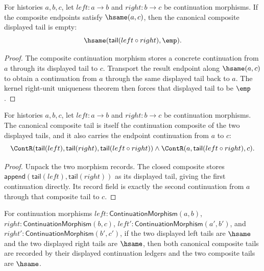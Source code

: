 \begin{theorem}
\label{thm:category-continuation-morphism-composite-endpoint-cycle-tail-empty}
For histories $a,b,c$, let $left:a\to b$ and $right:b\to c$ be continuation
morphisms. If the composite endpoints satisfy $\hsame(a,c)$, then the
canonical composite displayed tail is empty:
$$
\hsame(\mathsf{tail}(left\circ right),\emp).
$$
\end{theorem}
\begin{proof}
The composite continuation morphism stores a concrete continuation from $a$
through its displayed tail to $c$. Transport the result endpoint along
$\hsame(a,c)$ to obtain a continuation from $a$ through the same displayed tail
back to $a$. The kernel right-unit uniqueness theorem then forces that
displayed tail to be $\emp$.
\end{proof}


\begin{theorem}
\label{thm:continuation-morphism-composite-tail-continuation}
For histories $a,b,c$, let $left:a\to b$ and $right:b\to c$ be continuation
morphisms. The canonical composite tail is itself the continuation composite
of the two displayed tails, and it also carries the endpoint continuation
from $a$ to $c$:
$$
\ContR(\mathsf{tail}(left),\mathsf{tail}(right),
  \mathsf{tail}(left\circ right))
\land
\ContR(a,\mathsf{tail}(left\circ right),c).
$$
\end{theorem}
\begin{proof}
Unpack the two morphism records. The closed composite stores
$\mathsf{append}(\mathsf{tail}(left),\mathsf{tail}(right))$ as its displayed
tail, giving the first continuation directly. Its record field is exactly the
second continuation from $a$ through that composite tail to $c$.
\end{proof}

\begin{theorem}
\label{thm:category-continuation-morphism-comp-tail-hsame-congruence}
For continuation morphisms
$left:\mathsf{ContinuationMorphism}(a,b)$,
$right:\mathsf{ContinuationMorphism}(b,c)$,
$left':\mathsf{ContinuationMorphism}(a',b')$, and
$right':\mathsf{ContinuationMorphism}(b',c')$, if the two displayed left
tails are $\hsame$ and the two displayed right tails are $\hsame$, then both
canonical composite tails are recorded by their displayed continuation
ledgers and the two composite tails are $\hsame$.
\end{theorem}
